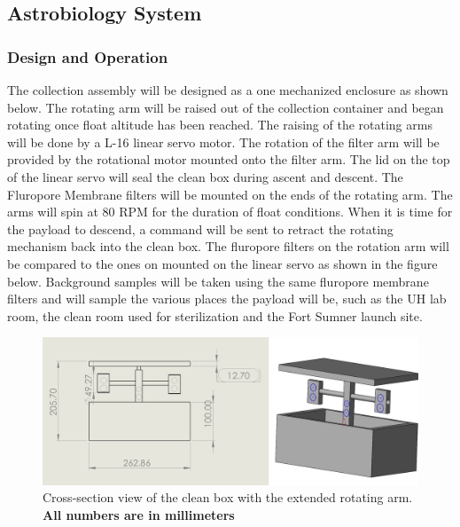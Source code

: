 \subsection{Astrobiology System}
\label{sec:AstrobiologySystem}

\subsubsection{Design and Operation}
The collection assembly will be designed as a one mechanized enclosure as shown below. The rotating arm will be raised out of the collection container and began rotating once float altitude has been reached. The raising of the rotating arms will be done by a L-16 linear servo motor. The rotation of the filter arm will be provided by the rotational motor mounted onto the filter arm. The lid on the top of the linear servo will seal the clean box during ascent and descent. The  Fluropore Membrane filters will be mounted on the ends of the rotating arm. The arms will spin at 80 RPM for the duration of float conditions. When it is time for the payload to descend, a command will be sent to retract the rotating mechanism back into the clean box. The fluropore filters on the rotation arm will be compared to the ones on mounted on the linear servo as shown in the figure below. Background samples will be taken using the same fluropore membrane filters and will sample the various places the payload will be, such as the UH lab room, the clean room used for sterilization and the Fort Sumner launch site. 

\begin{figure}[!h] 
	\begin{center}
		\includegraphics[width=\linewidth]{Figures/T-Arm.jpg}
		\caption{Cross-section view of the clean box with the extended rotating arm. \bf All numbers are in millimeters}
		\label{fig:AstroBox}
	\end{center}
\end{figure} 
